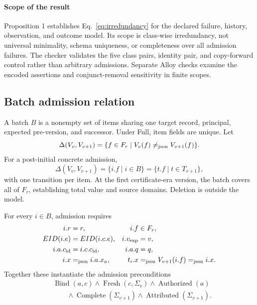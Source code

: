 \paragraph{Scope of the result}
Proposition 1 establishes Eq.~\eqref{eq:irredundancy} for the declared failure, history, observation, and outcome model. Its scope is class-wise irredundancy, not universal minimality, schema uniqueness, or completeness over all admission failures. The checker validates the five class pairs, identity pair, and copy-forward control rather than arbitrary admissions. Separate Alloy checks examine the encoded assertions and conjunct-removal sensitivity in finite scopes.

\subsection{Batch admission relation}

A batch $B$ is a nonempty set of items sharing one target record, principal, expected pre-version, and successor. Under Full, item fields are unique. Let
\begin{equation}
\Delta(V_v,V_{v+1})=\{f\in F_r\mid V_v(f)\mathrel{\neq_{\mathrm{json}}} V_{v+1}(f)\}.
\end{equation}
For a post-initial concrete admission,
\begin{equation}
\Delta(V_v,V_{v+1})=\{i.f\mid i\in B\}=\{t.f\mid t\in T_{v+1}\},
\label{eq:changed-fields}
\end{equation}
with one transition per item. At the first certificate-era version, the batch covers all of $F_r$, establishing total value and source domains. Deletion is outside the model.

For every $i\in B$, admission requires
\begin{align}
i.r &= r, & i.f&\in F_r,\nonumber\\
EID(i.e) &= EID(i.c.e), & i.v_{\mathrm{exp}}&=v,\nonumber\\
i.a.c_{\mathrm{id}}&=i.c.c_{\mathrm{id}}, & i.a.q&=q,\nonumber\\
i.x &\mathrel{=_{\mathrm{json}}} i.a.x_a, & t_i.x&\mathrel{=_{\mathrm{json}}} V_{v+1}(i.f)\mathrel{=_{\mathrm{json}}} i.x.
\label{eq:item-bindings}
\end{align}
Together these instantiate the admission preconditions
\begin{equation}
\begin{aligned}
&\operatorname{Bind}(a,c)\land\operatorname{Fresh}(c,\Sigma_v)\land\operatorname{Authorized}(a)\\
&\qquad\land\operatorname{Complete}(\Sigma_{v+1})\land\operatorname{Attributed}(\Sigma_{v+1}).
\end{aligned}
\end{equation}

